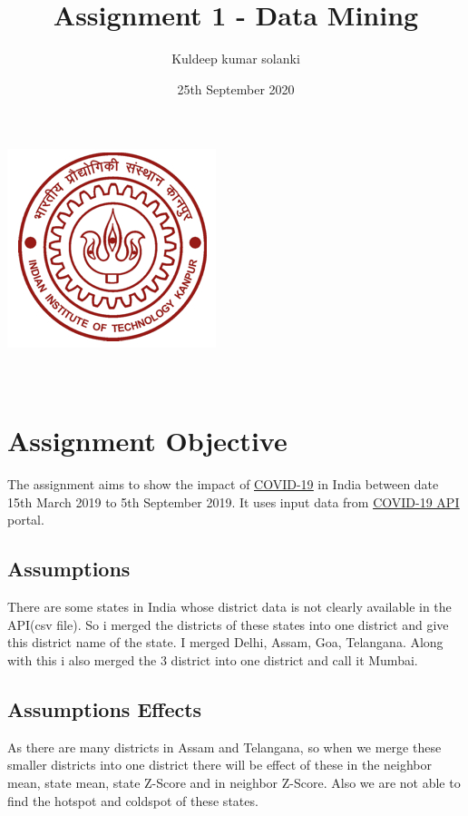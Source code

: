 \documentclass{report}
\title{Assignment 1 - Data Mining}
\author{Kuldeep kumar solanki}
\date{25th September 2020}
\begin{document}
\makeatletter
    \begin{titlepage}
        \begin{center}
            \includegraphics[width=0.7\linewidth]{images/redlogo.jpg}\\[4ex]
            {\huge \bfseries  \@title }\\[2ex] 
            {\LARGE  \@author}\\[50ex] 
            {\large \@date}
        \end{center}
    \end{titlepage}
\makeatother
\thispagestyle{empty}
\newpage

\tableofcontents
\newpage

\section{Assignment Objective}
\justify The assignment aims to show the impact of \href{https://www.covid19india.org/}{\underline{COVID-19}} in India between date 15th March 2019 to 5th September 2019. It uses input data from \href{https://api.covid19india.org/}{\underline{COVID-19 API}} portal.
\subsection{Assumptions}
\justify There are some states in India whose district data is not clearly available in the API(csv file). So i merged the districts of these states into one district and give this district name of the state.
I merged Delhi, Assam, Goa, Telangana. Along with this i also merged the 3 district into one district and call it Mumbai.
\subsection{Assumptions Effects}
\justify As there are many districts in Assam and Telangana, so when we merge these smaller districts into one district there will be effect of these in the neighbor mean, state mean, state Z-Score and in neighbor Z-Score. Also we are not able to find the hotspot and coldspot of these states.
\newpage
\end{document}
